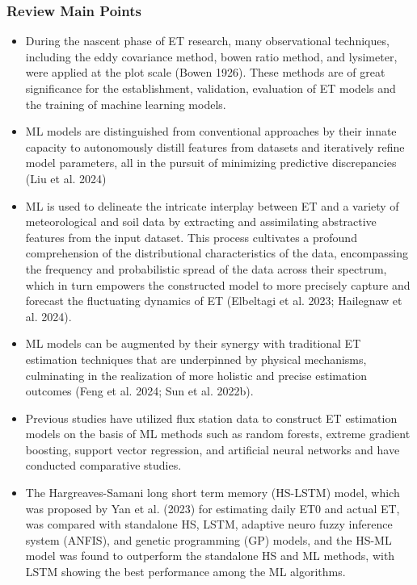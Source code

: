 \documentclass[paper=a4, fontsize=12pt]{scrartcl}
\begin{document}
	\subsubsection{Review Main Points}
	\begin{itemize}
		\item During the nascent phase of ET research, many observational techniques, including the eddy covariance method, bowen ratio method, and lysimeter, were applied at the plot scale (Bowen 1926). These methods are of great significance for the establishment, validation, evaluation of ET models and the training of machine learning models.
		\item ML models are distinguished from conventional approaches by their innate capacity to autonomously distill features from datasets and iteratively refine model parameters, all in the pursuit of minimizing predictive discrepancies (Liu et al. 2024)
		\item ML is used to delineate the intricate interplay between ET and a variety of meteorological and soil data by extracting and assimilating abstractive features from the input dataset. This process cultivates a profound comprehension of the distributional characteristics of the data, encompassing the frequency and probabilistic spread of the data across their spectrum, which in turn empowers the constructed model to more precisely capture and forecast the fluctuating dynamics of ET (Elbeltagi et al. 2023; Hailegnaw et al. 2024).
		\item ML models can be augmented by their synergy with traditional ET estimation techniques that are underpinned by physical mechanisms, culminating in the realization of more holistic and precise estimation outcomes (Feng et al. 2024; Sun et al. 2022b).
		\item Previous studies have utilized flux station data to construct ET estimation models on the basis of ML methods such as random forests, extreme gradient boosting, support vector regression, and artificial neural networks and have conducted comparative studies.
		\item The Hargreaves-Samani long short term memory (HS-LSTM) model, which was proposed by Yan et al. (2023) for estimating daily ET0 and actual ET, was compared with standalone HS, LSTM, adaptive neuro fuzzy inference system (ANFIS), and genetic programming (GP) models, and the HS-ML model was found to outperform the standalone HS and ML methods, with LSTM showing the best performance among the ML algorithms.
	\end{itemize}
\end{document}
